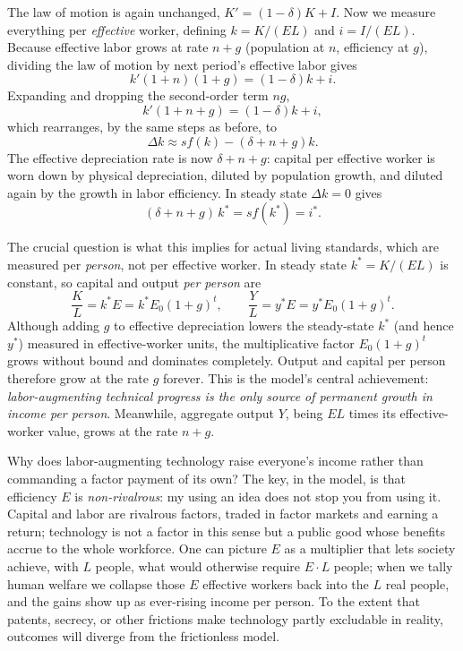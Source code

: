 The law of motion is again unchanged, $K' = (1-\delta)K + I$. Now we measure everything per \emph{effective} worker, defining $k = K/(EL)$ and $i = I/(EL)$. Because effective labor grows at rate $n + g$ (population at $n$, efficiency at $g$), dividing the law of motion by next period's effective labor gives
\[
k'(1+n)(1+g) = (1-\delta) k + i.
\]
Expanding and dropping the second-order term $ng$,
\[
k'(1 + n + g) = (1-\delta) k + i,
\]
which rearranges, by the same steps as before, to
\begin{equation}
\Delta k \approx s f(k) - (\delta + n + g) k.
\label{eq:solow-tech}
\end{equation}
The effective depreciation rate is now $\delta + n + g$: capital per effective worker is worn down by physical depreciation, diluted by population growth, and diluted again by the growth in labor efficiency. In steady state $\Delta k = 0$ gives
\[
(\delta + n + g)\, k^* = s f(k^*) = i^*.
\]

The crucial question is what this implies for actual living standards, which are measured per \emph{person}, not per effective worker. In steady state $k^* = K/(EL)$ is constant, so capital and output \emph{per person} are
\[
\frac{K}{L} = k^* E = k^* E_0 (1+g)^t,
\qquad
\frac{Y}{L} = y^* E = y^* E_0 (1+g)^t.
\]
Although adding $g$ to effective depreciation lowers the steady-state $k^*$ (and hence $y^*$) measured in effective-worker units, the multiplicative factor $E_0(1+g)^t$ grows without bound and dominates completely. Output and capital per person therefore grow at the rate $g$ forever. This is the model's central achievement: \emph{labor-augmenting technical progress is the only source of permanent growth in income per person}. Meanwhile, aggregate output $Y$, being $EL$ times its effective-worker value, grows at the rate $n + g$.

\begin{remark}
Why does labor-augmenting technology raise everyone's income rather than commanding a factor payment of its own? The key, in the model, is that efficiency $E$ is \emph{non-rivalrous}: my using an idea does not stop you from using it. Capital and labor are rivalrous factors, traded in factor markets and earning a return; technology is not a factor in this sense but a public good whose benefits accrue to the whole workforce. One can picture $E$ as a multiplier that lets society achieve, with $L$ people, what would otherwise require $E \cdot L$ people; when we tally human welfare we collapse those $E$ effective workers back into the $L$ real people, and the gains show up as ever-rising income per person. To the extent that patents, secrecy, or other frictions make technology partly excludable in reality, outcomes will diverge from the frictionless model.
\end{remark}

